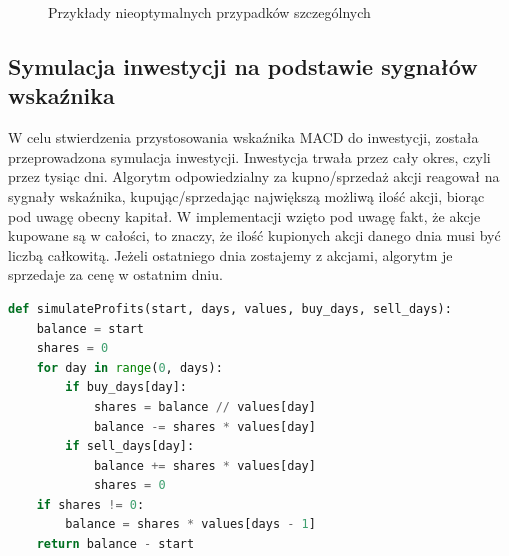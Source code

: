 \documentclass{article}
\begin{document}
\begin{figure}[h!]%
    \centering
    \qquad
    \caption{Przykłady nieoptymalnych przypadków szczególnych}%
    \label{fig:example}%
\end{figure}

\subsection{Symulacja inwestycji na podstawie sygnałów wskaźnika}

W celu stwierdzenia przystosowania wskaźnika MACD do inwestycji, została przeprowadzona symulacja inwestycji. Inwestycja trwała przez cały okres, czyli przez tysiąc dni. Algorytm odpowiedzialny za kupno/sprzedaż akcji reagował na sygnały wskaźnika, kupując/sprzedając największą możliwą ilość akcji, biorąc pod uwagę obecny kapitał. W implementacji wzięto pod uwagę fakt, że akcje kupowane są w całości, to znaczy, że ilość kupionych akcji danego dnia musi być liczbą całkowitą. Jeżeli ostatniego dnia zostajemy z akcjami, algorytm je sprzedaje za cenę w ostatnim dniu.

\vspace{0.75em}
\begin{lstlisting}[language=Python, caption=Implementacja symulacji inwestycji z użyciem sygnałów wskaźnika MACD]
def simulateProfits(start, days, values, buy_days, sell_days):
    balance = start
    shares = 0
    for day in range(0, days):
        if buy_days[day]:
            shares = balance // values[day]
            balance -= shares * values[day]
        if sell_days[day]:
            balance += shares * values[day]
            shares = 0
    if shares != 0:
        balance = shares * values[days - 1]
    return balance - start
\end{lstlisting}
\vspace{0.5em}
\end{document}
